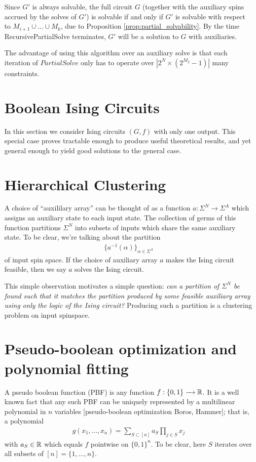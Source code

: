 \documentclass{article}
\begin{document}
Since $G'$ is always solvable, the full circuit $G$ (together with the auxiliary spins accrued by the solves of $G'$) is solvable if and only if $G'$ is solvable with respect to $M_{i+1} \cup ... \cup M_k$, due to Proposition \ref{prop:partial_solvability}. By the time RecursivePartialSolve terminates, $G'$ will be a solution to $G$ with auxiliaries.

The advantage of using this algorithm over an auxiliary solve is that each iteration of $PartialSolve$ only has to operate over $|2^N\times (2^{M_2} - 1)|$ many constraints.



\section{Boolean Ising Circuits}
In this section we consider Ising circuits $(G,f)$ with only one output. This special case proves tractable enough to produce useful theoretical results, and yet general enough to yield good solutions to the general case.

\begin{prop}\label{prop:boolean-ising-svm-equiv}
  
\end{prop}
\section{Hierarchical Clustering}

A choice of ``auxililary array'' can be thought of as a function $a:\Sigma^N \to \Sigma^A$ which assigns an auxiliary state to each input state. The collection of germs of this function partitions $\Sigma^N$ into subsets of inputs which share the same auxiliary state. To be clear, we're talking about the partition
\begin{align*}
  \{a^{-1}(\alpha)\}_{\alpha \in \Sigma^A}
\end{align*}
of input spin space. If the choice of auxiliary array $a$ makes the Ising circuit feasible, then we say $a$ solves the Ising circuit.

This simple observation motivates a simple question: \emph{can a partition of $\Sigma^N$ be found such that it matches the partition produced by some feasible auxiliary array using only the logic of the Ising circuit?} Producing such a partition is a clustering problem on input spinspace.

\section{Pseudo-boolean optimization and polynomial fitting}
A pseudo boolean function (PBF) is any function $f:\{0,1\}\to \bR$. It is a well known fact that any such PBF can be uniquely represented by a multilinear polynomial in $n$ variables [pseudo-boolean optimization Boros, Hammer]; that is, a polynomial
\begin{align*}
  g(x_1,...,x_n) = \sum_{S \subset [n]} a_S \prod_{j \in S}x_j
\end{align*}
with $a_S \in \mathbb{R}$ which equals $f$ pointwise on $\{0,1\}^n$. To be clear, here $S$ iterates over all subsets of $[n] = \{1,...,n\}$.
\end{document}

